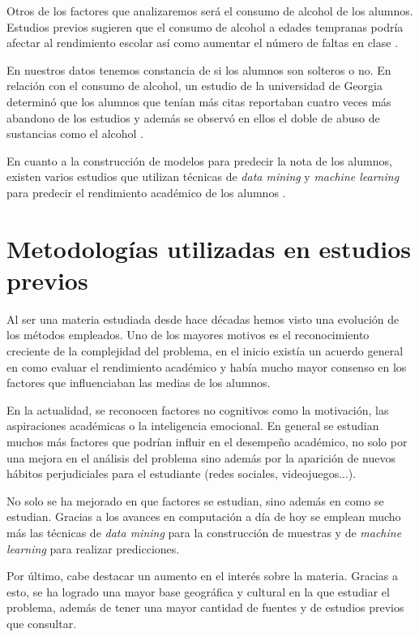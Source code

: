 Otros de los factores que analizaremos será el consumo de alcohol de los alumnos. Estudios previos sugieren que el consumo de alcohol a edades tempranas podría afectar al rendimiento escolar así como aumentar el número de faltas en clase \cite{wagner2007alcohol} \cite{kovacs2008relacion}.

En nuestros datos tenemos constancia de si los alumnos son solteros o no. En relación con el consumo de alcohol, un estudio de la universidad de Georgia determinó que los alumnos que tenían más citas reportaban cuatro veces más abandono de los estudios y además se observó en ellos el doble de abuso de sustancias como el alcohol \cite{orpinas2013dating}.

En cuanto a la construcción de modelos para predecir la nota de los alumnos, existen varios estudios que utilizan técnicas de \textit{data mining} y \textit{machine learning} para predecir el rendimiento académico de los alumnos \cite{mengash2020using} \cite{cortez2008using}.

\section{Metodologías utilizadas en estudios previos}

Al ser una materia estudiada desde hace décadas hemos visto una evolución de los métodos empleados. Uno de los mayores motivos es el reconocimiento creciente de la complejidad del problema, en el inicio existía un acuerdo general en como evaluar el rendimiento académico y había mucho mayor consenso en los factores que influenciaban las medias de los alumnos.

En la actualidad, se reconocen factores no cognitivos como la motivación, las aspiraciones académicas o la inteligencia emocional. En general se estudian muchos más factores que podrían influir en el desempeño académico, no solo por una mejora en el análisis del problema sino además por la aparición de nuevos hábitos perjudiciales para el estudiante (redes sociales, videojuegos...).

No solo se ha mejorado en que factores se estudian, sino además en como se estudian. Gracias a los avances en computación a día de hoy se emplean mucho más las técnicas de \textit{data mining} para la construcción de muestras y de \textit{machine learning} para realizar predicciones.

Por último, cabe destacar un aumento en el interés sobre la materia. Gracias a esto, se ha logrado una mayor base geográfica y cultural en la que estudiar el problema, además de tener una mayor cantidad de fuentes y de estudios previos que consultar.
